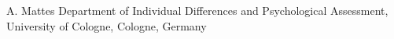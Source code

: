 
                {A. Mattes}
                {Department of Individual Differences and Psychological Assessment, University of Cologne, Cologne, Germany}
                